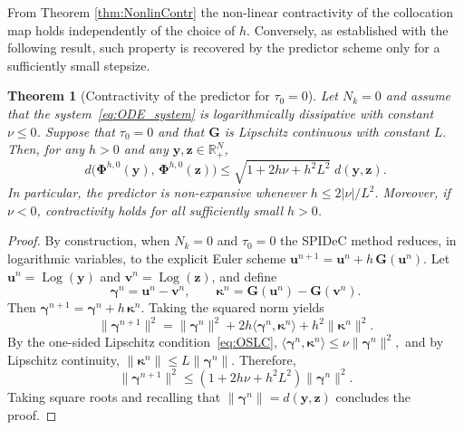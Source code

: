 \documentclass[a4paper,num-refs]{oup-contemporary-spidec}
\newtheorem{theorem}{Theorem}[section]
\begin{document}
From Theorem \ref{thm:NonlinContr} the non-linear contractivity of the collocation map holds independently of the choice of $h.$ Conversely, as established with the following result, such property is recovered by the predictor scheme only for a sufficiently small stepsize.  

\begin{theorem}[Contractivity of the predictor for $\tau_0=0$]\label{thm:PredContr}
    Let $N_k=0$ and assume that the system~\eqref{eq:ODE_system}
    is logarithmically dissipative with constant $\nu\leq 0$.
    Suppose that $\tau_0=0$ and that $\bm{G}$ is Lipschitz continuous with constant $L.$ Then, for any $h>0$ and any $\bm{y},\bm{z}\in\mathbb{R}_{+}^{N}$,
    \begin{equation}\label{eq:PredContract}
    d\bigl(\bm{\Phi}^{h,0}(\bm{y}),\,
           \bm{\Phi}^{h,0}(\bm{z})\bigr)
    \leq
    \sqrt{1 + 2h\nu + h^2L^2}\;
    d(\bm{y},\bm{z}).
    \end{equation}
    In particular, the predictor is non-expansive whenever  $h \leq 2|\nu|/L^2.$ Moreover, if $\nu<0$, contractivity holds for all sufficiently small $h>0$.
\end{theorem}
\begin{proof}
    By construction, when $N_k=0$ and $\tau_0=0$ the SPIDeC method reduces,
    in logarithmic variables, to the explicit Euler scheme $\bm{u}^{n+1} = \bm{u}^n + h\,\bm{G}(\bm{u}^n).$ Let $\bm{u}^n=\operatorname{Log}(\bm{y})$ and $\bm{v}^n=\operatorname{Log}(\bm{z})$, and define
    \[
    \bm{\gamma}^n = \bm{u}^n - \bm{v}^n, 
    \qquad
    \bm{\kappa}^n = \bm{G}(\bm{u}^n) - \bm{G}(\bm{v}^n).
    \]
    Then $\bm{\gamma}^{n+1} = \bm{\gamma}^n + h\,\bm{\kappa}^n.$ Taking the squared norm yields
    \begin{equation*}
        \|\bm{\gamma}^{n+1}\|^2= \|\bm{\gamma}^n\|^2
           + 2h \langle \bm{\gamma}^n, \bm{\kappa}^n \rangle
           + h^2 \|\bm{\kappa}^n\|^2.
    \end{equation*}
    By the one-sided Lipschitz condition~\eqref{eq:OSLC}, $\langle \bm{\gamma}^n, \bm{\kappa}^n \rangle\leq \nu \|\bm{\gamma}^n\|^2, $
    and by Lipschitz continuity, $\|\bm{\kappa}^n\|
    \leq L \|\bm{\gamma}^n\|.$ Therefore,
    \begin{equation*}
        \|\bm{\gamma}^{n+1}\|^2 \leq (1 + 2h\nu + h^2L^2)\|\bm{\gamma}^n\|^2.
    \end{equation*}
    Taking square roots and recalling that $\|\bm{\gamma}^n\| = d(\bm{y},\bm{z})$ concludes the proof.
\end{proof}
\end{document}
